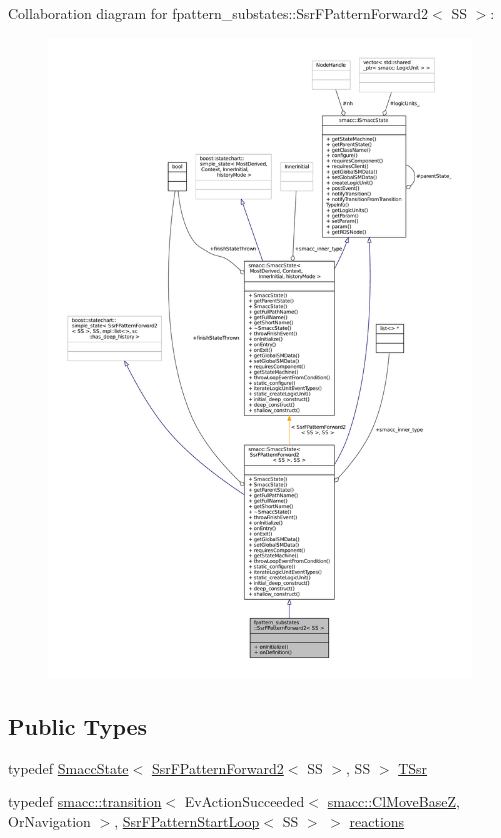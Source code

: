 Collaboration diagram for fpattern\+\_\+substates\+:\+:Ssr\+F\+Pattern\+Forward2$<$ SS $>$\+:
\nopagebreak
\begin{figure}[H]
\begin{center}
\leavevmode
\includegraphics[width=350pt]{structfpattern__substates_1_1SsrFPatternForward2__coll__graph}
\end{center}
\end{figure}
\subsection*{Public Types}
\begin{DoxyCompactItemize}
\item 
typedef \hyperlink{classSmaccState}{Smacc\+State}$<$ \hyperlink{structfpattern__substates_1_1SsrFPatternForward2}{Ssr\+F\+Pattern\+Forward2}$<$ SS $>$, SS $>$ \hyperlink{structfpattern__substates_1_1SsrFPatternForward2_a6da984f60e29760330b5e98020d8944f}{T\+Ssr}
\item 
typedef \hyperlink{classsmacc_1_1transition}{smacc\+::transition}$<$ Ev\+Action\+Succeeded$<$ \hyperlink{classsmacc_1_1ClMoveBaseZ}{smacc\+::\+Cl\+Move\+BaseZ}, Or\+Navigation $>$, \hyperlink{structfpattern__substates_1_1SsrFPatternStartLoop}{Ssr\+F\+Pattern\+Start\+Loop}$<$ SS $>$ $>$ \hyperlink{structfpattern__substates_1_1SsrFPatternForward2_a1beb972a6efbed75d4420b41cce9da34}{reactions}
\end{DoxyCompactItemize}
